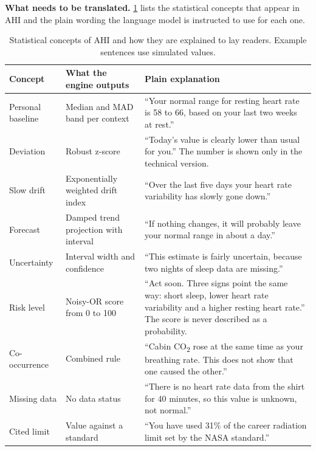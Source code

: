 \medskip\noindent\textbf{What needs to be translated.} \ref{tab:lay-concepts} lists the statistical concepts that appear in AHI and the plain wording the language model is instructed to use for each one.

\begin{table}[htbp]
\centering
\vspace{0.8em}
\caption{Statistical concepts of AHI and how they are explained to lay readers. Example sentences use simulated values.}
\label{tab:lay-concepts}
\footnotesize
\begin{tabular}{p{3.0cm}p{4.4cm}p{6.6cm}}
\hline
\textbf{Concept} & \textbf{What the engine outputs} & \textbf{Plain explanation} \\
\hline
Personal baseline & Median and MAD band per context & ``Your normal range for resting heart rate is 58 to 66, based on your last two weeks at rest.'' \\
Deviation & Robust z-score & ``Today's value is clearly lower than usual for you.'' The number is shown only in the technical version. \\
Slow drift & Exponentially weighted drift index & ``Over the last five days your heart rate variability has slowly gone down.'' \\
Forecast & Damped trend projection with interval & ``If nothing changes, it will probably leave your normal range in about a day.'' \\
Uncertainty & Interval width and confidence & ``This estimate is fairly uncertain, because two nights of sleep data are missing.'' \\
Risk level & Noisy-OR score from 0 to 100 & ``Act soon. Three signs point the same way: short sleep, lower heart rate variability and a higher resting heart rate.'' The score is never described as a probability. \\
Co-occurrence & Combined rule & ``Cabin CO\textsubscript{2} rose at the same time as your breathing rate. This does not show that one caused the other.'' \\
Missing data & No data status & ``There is no heart rate data from the shirt for 40 minutes, so this value is unknown, not normal.'' \\
Cited limit & Value against a standard & ``You have used 31\% of the career radiation limit set by the NASA standard.'' \\
\hline
\end{tabular}
\vspace{1.2em}
\end{table}

